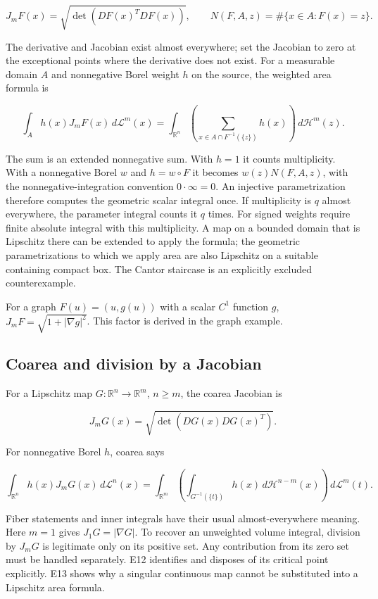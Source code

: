 \documentclass[
  11pt,
]{article}
\begin{document}
\[
J_mF(x)=\sqrt{\det(DF(x)^TDF(x))},\qquad
N(F,A,z)=\#\{x\in A:F(x)=z\}.
\]

The derivative and Jacobian exist almost everywhere; set the Jacobian to
zero at the exceptional points where the derivative does not exist. For
a measurable domain \(A\) and nonnegative Borel weight \(h\) on the
source, the weighted area formula is

\[
\int_A h(x)J_mF(x)\,d\mathcal L^m(x)
=\int_{\mathbb R^n}\left(\sum_{x\in A\cap F^{-1}(\{z\})}h(x)\right)
\,d\mathcal H^m(z).
\]

The sum is an extended nonnegative sum. With \(h=1\) it counts
multiplicity. With a nonnegative Borel \(w\) and \(h=w\circ F\) it
becomes \(w(z)N(F,A,z)\), with the nonnegative-integration convention
\(0\cdot\infty=0\). An injective parametrization therefore computes the
geometric scalar integral once. If multiplicity is \(q\) almost
everywhere, the parameter integral counts it \(q\) times. For signed
weights require finite absolute integral with this multiplicity. A map
on a bounded domain that is Lipschitz there can be extended to apply the
formula; the geometric parametrizations to which we apply area are also
Lipschitz on a suitable containing compact box. The Cantor staircase is
an explicitly excluded counterexample.

For a graph \(F(u)=(u,g(u))\) with a scalar \(C^1\) function \(g\),
\(J_mF=\sqrt{1+|\nabla g|^2}\). This factor is derived in the graph
example.

\subsection{Coarea and division by a
Jacobian}\label{coarea-and-division-by-a-jacobian}

For a Lipschitz map \(G:\mathbb R^n\to\mathbb R^m\), \(n\geq m\), the
coarea Jacobian is

\[
J_mG(x)=\sqrt{\det(DG(x)DG(x)^T)}.
\]

For nonnegative Borel \(h\), coarea says

\[
\int_{\mathbb R^n}h(x)J_mG(x)\,d\mathcal L^n(x)
=\int_{\mathbb R^m}\left(\int_{G^{-1}(\{t\})}h(x)
\,d\mathcal H^{n-m}(x)\right)\,d\mathcal L^m(t).
\]

Fiber statements and inner integrals have their usual almost-everywhere
meaning. Here \(m=1\) gives \(J_1G=|\nabla G|\). To recover an
unweighted volume integral, division by \(J_mG\) is legitimate only on
its positive set. Any contribution from its zero set must be handled
separately. E12 identifies and disposes of its critical point
explicitly. E13 shows why a singular continuous map cannot be
substituted into a Lipschitz area formula.
\end{document}
